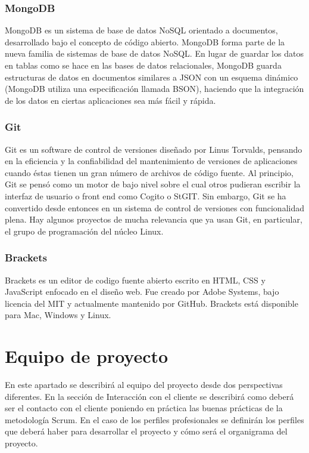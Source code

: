 \subsubsection{MongoDB}
MongoDB es un sistema de base de datos NoSQL orientado a documentos, desarrollado bajo el concepto de código abierto. MongoDB forma parte de la nueva familia de sistemas de base de datos NoSQL. En lugar de guardar los datos en tablas como se hace en las bases de datos relacionales, MongoDB guarda estructuras de datos en documentos similares a JSON con un esquema dinámico (MongoDB utiliza una especificación llamada BSON), haciendo que la integración de los datos en ciertas aplicaciones sea más fácil y rápida.

\subsubsection{Git}
Git es un software de control de versiones diseñado por Linus Torvalds, pensando en la eficiencia y la confiabilidad del mantenimiento de versiones de aplicaciones cuando éstas tienen un gran número de archivos de código fuente. Al principio, Git se pensó como un motor de bajo nivel sobre el cual otros pudieran escribir la interfaz de usuario o front end como Cogito o StGIT. Sin embargo, Git se ha convertido desde entonces en un sistema de control de versiones con funcionalidad plena. Hay algunos proyectos de mucha relevancia que ya usan Git, en particular, el grupo de programación del núcleo Linux.


\subsubsection{Brackets}
Brackets es un editor de codigo fuente abierto escrito en HTML, CSS y JavaScript enfocado en el diseño web. Fue creado por Adobe Systems, bajo licencia del MIT y actualmente mantenido por GitHub. Brackets está disponible para Mac, Windows y Linux.




\section{Equipo de proyecto}
En este apartado se describirá al equipo del proyecto desde dos perspectivas diferentes. En la sección de Interacción con el cliente se describirá como deberá ser el contacto con el cliente poniendo en práctica las buenas prácticas de la metodología Scrum. En el caso de los perfiles profesionales se definirán los perfiles que deberá haber para desarrollar el proyecto y cómo será el organigrama del proyecto.

